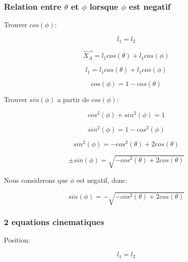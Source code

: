 \documentclass{article}
\begin{document}
\subsubsection{Relation entre $\theta$ et $\phi$ lorsque $\phi$ est negatif}
Trouver $cos(\phi)$:

\begin{equation}
l_1 = l_2
\end{equation}

\begin{equation}
\overrightarrow{X_A} = l_1cos(\theta)+l_1cos(\phi)
\end{equation}

\begin{equation}
l_1 = l_1cos(\theta)+l_1cos(\phi)
\end{equation}

\begin{equation}
cos(\phi) = 1-cos(\theta)
\end{equation}

\noindent Trouver $sin(\phi)$ a partir de $cos(\phi)$:

\begin{equation}
cos^2(\phi)+sin^2(\phi) = 1
\end{equation}

\begin{equation}
sin^2(\phi) = 1-cos^2(\phi)
\end{equation}

\begin{equation}
sin^2(\phi) = -cos^2(\theta)+2cos(\theta)
\end{equation}

\begin{equation}
\pm sin(\phi) = \sqrt{-cos^2(\theta)+2cos(\theta)}
\end{equation}

\noindent Nous considerons que $\phi$ est negatif, donc:

\begin{equation}
sin(\phi) = -\sqrt{-cos^2(\theta)+2cos(\theta)}
\end{equation}

\subsubsection{2 equations cinematiques}
Position:

\begin{equation}
l_1 = l_2
\end{equation}
\end{document}

